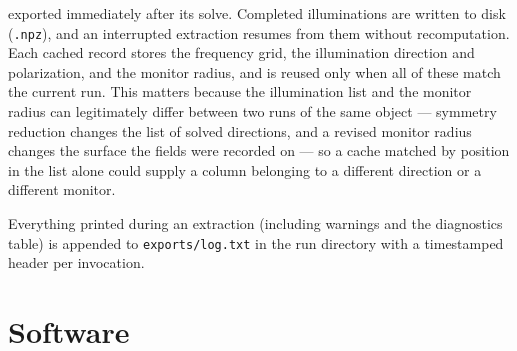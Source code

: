 \documentclass[11pt]{article}
\begin{document}
\begin{description}
exported immediately after its solve.  Completed illuminations are
written to disk (\texttt{.npz}), and an interrupted extraction resumes
from them without recomputation.  Each cached record stores the
frequency grid, the illumination direction and polarization, and the
monitor radius, and is reused only when all of these match the current
run.  This matters because the illumination list and the monitor
radius can legitimately differ between two runs of the same object ---
symmetry reduction changes the list of solved directions, and a
revised monitor radius changes the surface the fields were recorded
on --- so a cache matched by position in the list alone could supply a
column belonging to a different direction or a different monitor.
\item[Run log.]  Everything printed during an extraction (including
warnings and the diagnostics table) is appended to
\texttt{exports/log.txt} in the run directory with a timestamped header
per invocation.
\end{description}

\section{Software}
\end{document}
